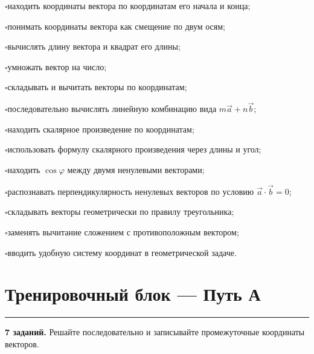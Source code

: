 \documentclass[a4paper,12pt]{article}
\newcommand{\vct}[1]{\vec{#1}}
\newcommand{\sectionline}{%
    \vspace{0.1em}
    {\color{accent}\rule{\linewidth}{0.6pt}}
    \vspace{0.3em}
}
\newcommand{\topic}[1]{%
    \Needspace{7\baselineskip}%
    \section*{\color{darkaccent}#1}
    \sectionline
}
\newcommand{\checkitem}[1]{%
    \par\noindent
    {\color{accent}\(\square\)}\;#1\par
}
\begin{document}
\checkitem{находить координаты вектора по координатам его начала и конца;}
\checkitem{понимать координаты вектора как смещение по двум осям;}
\checkitem{вычислять длину вектора и квадрат его длины;}
\checkitem{умножать вектор на число;}
\checkitem{складывать и вычитать векторы по координатам;}
\checkitem{последовательно вычислять линейную комбинацию вида \(m\vct a+n\vct b\);}
\checkitem{находить скалярное произведение по координатам;}
\checkitem{использовать формулу скалярного произведения через длины и угол;}
\checkitem{находить \(\cos\varphi\) между двумя ненулевыми векторами;}
\checkitem{распознавать перпендикулярность ненулевых векторов по условию \(\vct a\cdot\vct b=0\);}
\checkitem{складывать векторы геометрически по правилу треугольника;}
\checkitem{заменять вычитание сложением с противоположным вектором;}
\checkitem{вводить удобную систему координат в геометрической задаче.}

\clearpage

\topic{Тренировочный блок --- Путь А}

\textbf{7 заданий.} Решайте последовательно и записывайте промежуточные координаты векторов.
\end{document}
